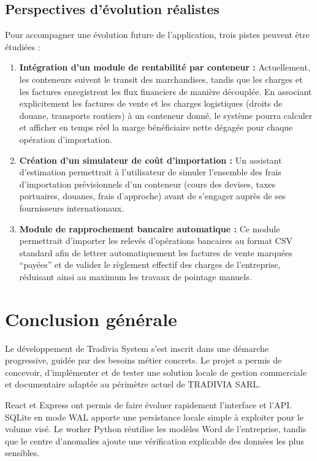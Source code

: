 \documentclass[12pt,a4paper,oneside]{report}
\newcommand{\Entreprise}{TRADIVIA SARL}
\begin{document}
\section{Perspectives d'évolution réalistes}
Pour accompagner une évolution future de l'application, trois pistes peuvent être étudiées :
\begin{enumerate}
  \item \textbf{Intégration d'un module de rentabilité par conteneur : } Actuellement, les conteneurs suivent le transit des marchandises, tandis que les charges et les factures enregistrent les flux financiers de manière découplée. En associant explicitement les factures de vente et les charges logistiques (droits de douane, transports routiers) à un conteneur donné, le système pourra calculer et afficher en temps réel la marge bénéficiaire nette dégagée pour chaque opération d'importation.
  \item \textbf{Création d'un simulateur de coût d'importation : } Un assistant d'estimation permettrait à l'utilisateur de simuler l'ensemble des frais d'importation prévisionnels d'un conteneur (cours des devises, taxes portuaires, douanes, frais d'approche) avant de s'engager auprès de ses fournisseurs internationaux.
  \item \textbf{Module de rapprochement bancaire automatique : } Ce module permettrait d'importer les relevés d'opérations bancaires au format CSV standard afin de lettrer automatiquement les factures de vente marquées \enquote{payées} et de valider le règlement effectif des charges de l'entreprise, réduisant ainsi au maximum les travaux de pointage manuels.
\end{enumerate}

\chapter*{Conclusion générale}
Le développement de Tradivia System s'est inscrit dans une démarche progressive, guidée par des besoins métier concrets. Le projet a permis de concevoir, d'implémenter et de tester une solution locale de gestion commerciale et documentaire adaptée au périmètre actuel de \Entreprise.

React et Express ont permis de faire évoluer rapidement l'interface et l'API. SQLite en mode WAL apporte une persistance locale simple à exploiter pour le volume visé. Le worker Python réutilise les modèles Word de l'entreprise, tandis que le centre d'anomalies ajoute une vérification explicable des données les plus sensibles.
\end{document}
